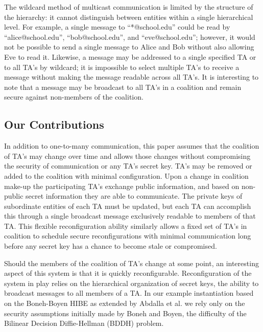 \documentclass[10pt]{llncs}
\begin{document}
	The wildcard method of multicast communication is limited by the structure of the hierarchy: it cannot distinguish between entities within a single hierarchical level.  For example, a single message to ``*@school.edu'' could be read by ``alice@school.edu'', ``bob@school.edu'', and ``eve@school.edu''; however, it would not be possible to send a single message to Alice and Bob without also allowing Eve to read it. Likewise, a message may be addressed to a single specified TA or to all TA's by wildcard; it is impossible to select multiple TA's to receive a message without making the message readable across all TA's. It is interesting to note that a message may be broadcast to all TA's in a coalition and remain secure against non-members of the coalition.

\subsection{Our Contributions}

	In addition to one-to-many communication, this paper assumes that the coalition of TA's may change over time and allows those changes without compromising the security of communication or any TA's secret key.  TA's may be removed or added to the coalition with minimal configuration.  Upon a change in coalition make-up the participating TA's exchange public information, and based on non-public secret information they are able to communicate.  The private keys of subordinate entities of each TA must be updated, but each TA can accomplish this through a single broadcast message exclusively readable to members of that TA.  This flexible reconfiguration ability similarly allows a fixed set of TA's in coalition to schedule secure reconfigurations with minimal communication long before any secret key has a chance to become stale or compromised.
	
	Should the members of the coalition of TA's change at some point, an interesting aspect of this system is that it is quickly reconfigurable.  Reconfiguration of the system in play relies on the hierarchical organization of secret keys, the ability to broadcast messages to all members of a TA.  In our example instantiation based on the Boneh-Boyen HIBE as extended by Abdalla et al. we rely only on the security assumptions initially made by Boneh and Boyen, the difficulty of the Bilinear Decision Diffie-Hellman (BDDH) problem.
\end{document}
